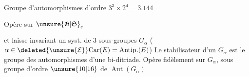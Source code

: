 Groupe d'automorphismes 
d'ordre $3^3\times2^4=3.144$ \unsure{,}

Opère sur $\unsure{\mathfrak G|\mathfrak S}_{\varepsilon}$

et laisse invariant  un syst.
de $3$ sous-groupes $G_\alpha$
($\alpha\in\deleted{\unsure{\mathcal E}}\mathrm{Car}(E)=\mathrm{Antip.}(E)$)
Le stabilisateur d'un $G_\alpha$ est le groupe des
automorphismes d'une bi-ditriade. Opère
fidèlement sur $G_\alpha$, sous groupe d'ordre $\unsure{10|16}$ de
$\operatorname{Aut}(G_\alpha)$

